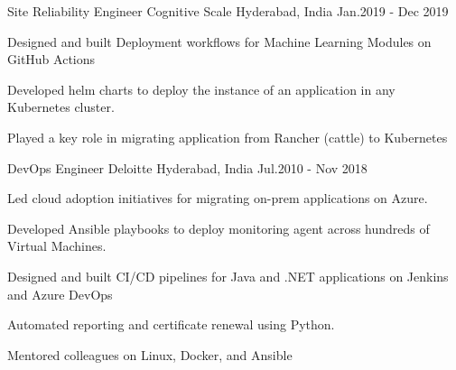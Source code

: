 \begin{cventries}
{    }
\vspace{1\baselineskip}
  \cventry
    { Site Reliability Engineer } %
    {Cognitive Scale} %
    {Hyderabad, India} %
    {Jan.2019 - Dec 2019 } %
    {
      \begin{cvitems} %
        \item {Designed and built Deployment workflows for Machine Learning Modules on GitHub Actions}
        \item {Developed helm charts to deploy the instance of an application in any Kubernetes cluster. }
        \item { Played a key role in migrating application from Rancher (cattle) to Kubernetes }
      \end{cvitems}
    }
\vspace{1\baselineskip}
  \cventry
    { DevOps Engineer } %
    {Deloitte} %
    {Hyderabad, India} %
    {Jul.2010 -  Nov 2018 } %
    {
      \begin{cvitems} %
        \item {Led cloud adoption initiatives for migrating on-prem applications on Azure.}
        \item {Developed Ansible playbooks to deploy monitoring agent across hundreds of Virtual Machines.}
        \item {Designed and built CI/CD pipelines for Java and .NET applications on Jenkins and Azure DevOps}   
        \item {Automated reporting and certificate renewal using Python.}
        \item {Mentored colleagues on Linux, Docker, and Ansible}
      \end{cvitems}
    }

\end{cventries}
